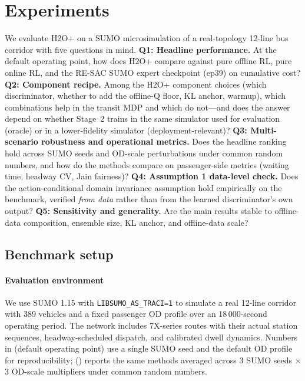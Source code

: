 \section{Experiments}
\label{sec:experiments}

We evaluate H2O+ on a SUMO microsimulation of a real-topology 12-line bus corridor with five questions in mind.
\textbf{Q1: Headline performance.}
At the default operating point, how does H2O+ compare against pure offline RL, pure online RL, and the RE-SAC SUMO expert checkpoint (ep39) on cumulative cost?
\textbf{Q2: Component recipe.}
Among the H2O+ component choices (which discriminator, whether to add the offline-Q floor, KL anchor, warmup), which combinations help in the transit MDP and which do not---and does the answer depend on whether Stage~2 trains in the same simulator used for evaluation (oracle) or in a lower-fidelity simulator (deployment-relevant)?
\textbf{Q3: Multi-scenario robustness and operational metrics.}
Does the headline ranking hold across SUMO seeds and OD-scale perturbations under common random numbers, and how do the methods compare on passenger-side metrics (waiting time, headway CV, Jain fairness)?
\textbf{Q4: Assumption 1 data-level check.}
Does the action-conditional domain invariance assumption hold empirically on the benchmark, verified \emph{from data} rather than from the learned discriminator's own output?
\textbf{Q5: Sensitivity and generality.}
Are the main results stable to offline-data composition, ensemble size, KL anchor, and offline-data scale?

\subsection{Benchmark setup}
\label{sec:exp:setup}

\paragraph{Evaluation environment}
We use SUMO 1.15 \citep{lopez2018microscopic} with \texttt{LIBSUMO\_\allowbreak AS\_\allowbreak TRACI=1} to simulate a real 12-line corridor with 389 vehicles and a fixed passenger OD profile over an 18\,000-second operating period.
The network includes 7X-series routes with their actual station sequences, headway-scheduled dispatch, and calibrated dwell dynamics.
Numbers in  (default operating point) use a single SUMO seed and the default OD profile for reproducibility;  () reports the same methods averaged across $3$ SUMO seeds $\times$ $3$ OD-scale multipliers under common random numbers.

